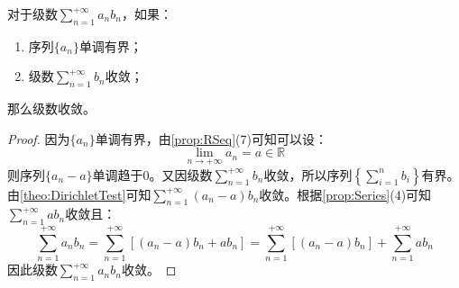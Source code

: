 \begin{theorem}\label{theo:AbelTest}
	对于级数$\sum\limits_{n=1}^{+\infty}a_nb_n$，如果：
	\begin{enumerate}
		\item 序列$\{a_n\}$单调有界；
		\item 级数$\sum\limits_{n=1}^{+\infty}b_n$收敛；
	\end{enumerate}
	那么级数收敛。
\end{theorem}
\begin{proof}
	因为$\{a_n\}$单调有界，由\cref{prop:RSeq}(7)可知可以设：
	\begin{equation*}
		\lim_{n\to+\infty}a_n=a\in\mathbb{R}
	\end{equation*}
	则序列$\{a_n-a\}$单调趋于$0$。又因级数$\sum\limits_{n=1}^{+\infty}b_n$收敛，所以序列$\left\{\sum\limits_{i=1}^nb_i\right\}$有界。由\cref{theo:DirichletTest}可知$\sum\limits_{n=1}^{+\infty}(a_n-a)b_n$收敛。根据\cref{prop:Series}(4)可知$\sum\limits_{n=1}^{+\infty}ab_n$收敛且：
	\begin{equation*}
		\sum_{n=1}^{+\infty}a_nb_n=\sum_{n=1}^{+\infty}\left[(a_n-a)b_n+ab_n\right]=\sum_{n=1}^{+\infty}\left[(a_n-a)b_n\right]+\sum_{n=1}^{+\infty}ab_n
	\end{equation*}
	因此级数$\sum\limits_{n=1}^{+\infty}a_nb_n$收敛。
\end{proof}
